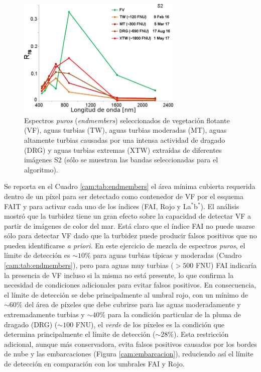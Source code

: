         \begin{figure}
        \centering
        \includegraphics[width=0.7\textwidth]{cam/figures/endmembers.png}
        \caption[Espectros de \textit{endmembers} seleccionados de vegetación flotante y varios tipos de aguas turbias extraídos de diferentes imágenes S2.]{Espectros \textit{puros} (\textit{endmembers}) seleccionados de vegetación flotante (VF), aguas turbias (TW), aguas turbias moderadas (MT), aguas altamente turbias causadas por una intensa actividad de dragado (DRG) y aguas turbias extremas (XTW) extraídas de diferentes imágenes S2 (sólo se muestran las bandas seleccionadas para el algoritmo).}
        \label{cam:endmembers}
        \end{figure}

        Se reporta en el Cuadro \ref{cam:tab:endmembers} el área mínima cubierta requerida dentro de un píxel para ser detectado como contenedor de VF por el esquema FAIT y para activar cada uno de los índices (FAI, Rojo y La$^{*}$b$^{*}$). El análisis mostró que la turbidez tiene un gran efecto sobre la capacidad de detectar VF a partir de imágenes de color del mar. Está claro que el índice FAI no puede usarse sólo para detectar VF dado que la turbidez puede producir falsos positivos que no pueden identificarse \textit{a priori}. En este ejercicio de mezcla de espectros \textit{puros}, el límite de detección es $\sim 10\%$ para aguas turbias típicas y moderadas (Cuadro \ref{cam:tab:endmembers}), pero para aguas muy turbias ($> 500$ FNU) FAI indicaría la presencia de VF incluso si la misma no está presente, lo que confirma la necesidad de condiciones adicionales para evitar falsos positivos. En consecuencia, el límite de detección se debe principalmente al umbral rojo, con un mínimo de $\sim 60 \%$ del área de píxeles que debe cubrirse para las aguas moderadamente y extremadamente turbias y $\sim 40\%$ para la condición particular de la pluma de dragado (DRG) ($\sim 100$ FNU), el \textit{verde} de los píxeles es la condición que determina principalmente el límite de detección ($\sim 28\%$). Esta restricción adicional, aunque más conservadora, evita falsos positivos causados por los bordes de nube y las embarcaciones (Figura \ref{cam:embarcacion}), reduciendo así el límite de detección en comparación con los umbrales FAI y Rojo.

